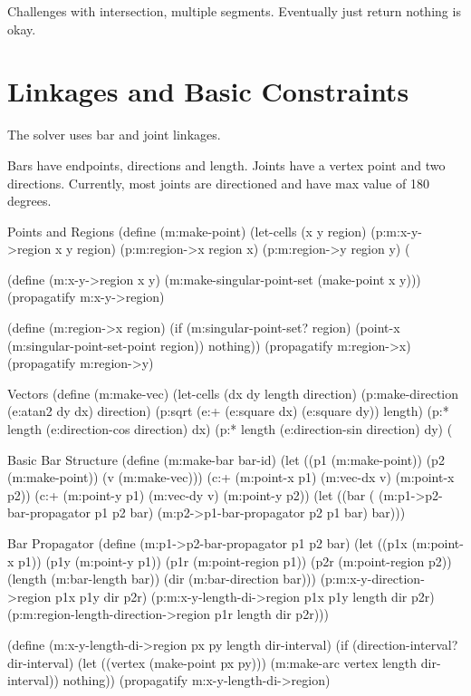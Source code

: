 Challenges with intersection, multiple segments. Eventually just
return nothing is okay.

\section{Linkages and Basic Constraints}

The solver uses bar and joint linkages.

Bars have endpoints, directions and length. Joints have a vertex point
and two directions. Currently, most joints are directioned and have
max value of 180 degrees.

\begin{code-listing}
[label=point-region]
{Points and Regions}
(define (m:make-point)
  (let-cells (x y region)
    (p:m:x-y->region x y region)
    (p:m:region->x region x)
    (p:m:region->y region y)
    (%

(define (m:x-y->region x y)
  (m:make-singular-point-set (make-point x y)))
(propagatify m:x-y->region)

(define (m:region->x region)
  (if (m:singular-point-set? region)
      (point-x (m:singular-point-set-point region))
      nothing))
(propagatify m:region->x)
(propagatify m:region->y)
\end{code-listing}

\begin{code-listing}
[label=vec-struct]
{Vectors}
(define (m:make-vec)
  (let-cells (dx dy length direction)
    (p:make-direction (e:atan2 dy dx) direction)
    (p:sqrt (e:+ (e:square dx)
                 (e:square dy))
            length)
    (p:* length (e:direction-cos direction) dx)
    (p:* length (e:direction-sin direction) dy)
    (%
\end{code-listing}

\begin{code-listing}
[label=bar-struct]
{Basic Bar Structure}
(define (m:make-bar bar-id)
  (let ((p1 (m:make-point))
        (p2 (m:make-point))
        (v (m:make-vec)))
    (c:+ (m:point-x p1) (m:vec-dx v)
         (m:point-x p2))
    (c:+ (m:point-y p1) (m:vec-dy v)
         (m:point-y p2))
    (let ((bar (%
      (m:p1->p2-bar-propagator p1 p2 bar)
      (m:p2->p1-bar-propagator p2 p1 bar)
      bar)))
\end{code-listing}

\begin{code-listing}
[label=bar-propagator]
{Bar Propagator}
(define (m:p1->p2-bar-propagator p1 p2 bar)
  (let ((p1x (m:point-x p1))
        (p1y (m:point-y p1))
        (p1r (m:point-region p1))
        (p2r (m:point-region p2))
        (length (m:bar-length bar))
        (dir (m:bar-direction bar)))
    (p:m:x-y-direction->region p1x p1y dir p2r)
    (p:m:x-y-length-di->region p1x p1y length dir p2r)
    (p:m:region-length-direction->region p1r length dir p2r)))

(define (m:x-y-length-di->region px py length dir-interval)
  (if (direction-interval? dir-interval)
      (let ((vertex (make-point px py)))
        (m:make-arc vertex length dir-interval))
      nothing))
(propagatify m:x-y-length-di->region)
\end{code-listing}


